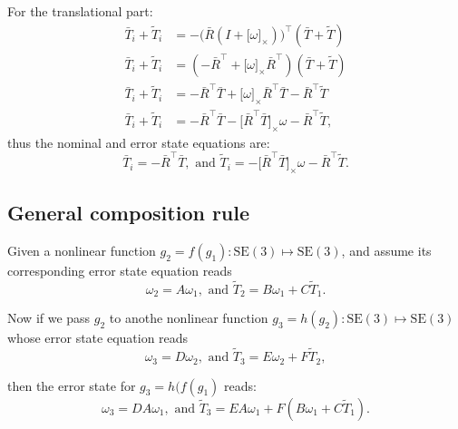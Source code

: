 \documentclass[letter,10pt]{article}
\newcommand{\SE}[1]{ \mathrm{SE(#1)} }
\newcommand{\asym}[1]{{\lbrack #1\rbrack}_\times{}}
\begin{document}
For the translational part:
\begin{align}
    \bar T_i + \tilde T_i &= -\big(\bar R(I + \asym{\omega})\big)^\top(\bar T + \tilde T) \\
    \bar T_i + \tilde T_i &= (-\bar R^\top + \asym{\omega}\bar R^\top)(\bar T + \tilde T) \\
    \bar T_i + \tilde T_i &= -\bar R^\top \bar T + \asym{\omega}\bar R^\top\bar T -\bar R^\top \tilde T \\
    \bar T_i + \tilde T_i &= -\bar R^\top \bar T - \asym{\bar R^\top\bar T}\omega -\bar R^\top \tilde T,
\end{align}
thus the nominal and error state equations are:
$$
\bar T_i = -\bar R^\top\bar T,\text{ and } \tilde T_i = -\asym{\bar R^\top\bar T}\omega - \bar R^\top \tilde T.
$$

\subsection{General composition rule}
Given a nonlinear function $g_2=f(g_1): \SE{3}\mapsto\SE{3}$, and assume its corresponding error state equation reads
$$
\omega_2 = A \omega_1, \text{ and } \tilde T_2 = B \omega_1 + C \tilde T_1.
$$

Now if we pass $g_2$ to anothe nonlinear function $g_3=h(g_2):\SE{3}\mapsto\SE{3}$ whose error state equation reads
$$
\omega_3 = D \omega_2, \text{ and } \tilde T_3 = E \omega_2 + F \tilde T_2,
$$

then the error state for $g_3=h(f(g_1)$ reads:
$$
\omega_3 = D A \omega_1, \text{ and } \tilde T_3 = E A \omega_1 + F(B\omega_1 + C\tilde T_1).
$$




\clearpage


\end{document}
